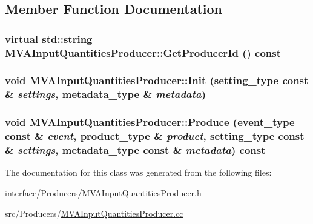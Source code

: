 \subsection{Member Function Documentation}
\hypertarget{classMVAInputQuantitiesProducer_ade0e1156bab3ebe0cc16791872c5220a}{
\subsubsection[{GetProducerId}]{\setlength{\rightskip}{0pt plus 5cm}virtual std::string MVAInputQuantitiesProducer::GetProducerId () const}}
\label{classMVAInputQuantitiesProducer_ade0e1156bab3ebe0cc16791872c5220a}
\hypertarget{classMVAInputQuantitiesProducer_a97888cc193c53efbcd27d07a23ac60da}{
\subsubsection[{Init}]{\setlength{\rightskip}{0pt plus 5cm}void MVAInputQuantitiesProducer::Init (setting\_\-type const \& {\em settings}, \/  metadata\_\-type \& {\em metadata})}}
\label{classMVAInputQuantitiesProducer_a97888cc193c53efbcd27d07a23ac60da}
\hypertarget{classMVAInputQuantitiesProducer_a58ea5b944538535fe441350813219945}{
\subsubsection[{Produce}]{\setlength{\rightskip}{0pt plus 5cm}void MVAInputQuantitiesProducer::Produce (event\_\-type const \& {\em event}, \/  product\_\-type \& {\em product}, \/  setting\_\-type const \& {\em settings}, \/  metadata\_\-type const \& {\em metadata}) const}}
\label{classMVAInputQuantitiesProducer_a58ea5b944538535fe441350813219945}


The documentation for this class was generated from the following files:\begin{DoxyCompactItemize}
\item 
interface/Producers/\hyperlink{MVAInputQuantitiesProducer_8h}{MVAInputQuantitiesProducer.h}\item 
src/Producers/\hyperlink{MVAInputQuantitiesProducer_8cc}{MVAInputQuantitiesProducer.cc}\end{DoxyCompactItemize}
